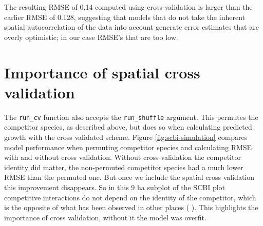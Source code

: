 \documentclass[12pt]{article}
\newenvironment{Shaded}{\begin{snugshade}}{\end{snugshade}}
\newcommand{\CommentTok}[1]{\textcolor[rgb]{0.56,0.35,0.01}{\textit{#1}}}
\newcommand{\DataTypeTok}[1]{\textcolor[rgb]{0.13,0.29,0.53}{#1}}
\newcommand{\KeywordTok}[1]{\textcolor[rgb]{0.13,0.29,0.53}{\textbf{#1}}}
\newcommand{\NormalTok}[1]{#1}
\newcommand{\OperatorTok}[1]{\textcolor[rgb]{0.81,0.36,0.00}{\textbf{#1}}}
\newcommand{\StringTok}[1]{\textcolor[rgb]{0.31,0.60,0.02}{#1}}
\begin{document}
\begin{Shaded}
\end{Shaded}

\begin{Shaded}
\end{Shaded}

The resulting RMSE of 0.14 computed using cross-validation is larger
than the earlier RMSE of 0.128, suggesting that models that do not take
the inherent spatial autocorrelation of the data into account generate
error estimates that are overly optimistic; in our case RMSE's that are
too low.

\hypertarget{importance-of-spatial-cross-validation}{%
\section{Importance of spatial cross
validation}\label{importance-of-spatial-cross-validation}}

The \texttt{run\_cv} function also accepts the \texttt{run\_shuffle}
argument. This permutes the competitor species, as described above, but
does so when calculating predicted growth with the cross validated
scheme. Figure \ref{fig:scbi-simulation} compares model performance when
permuting competitor species and calculating RMSE with and without cross
validation. Without cross-validation the competitor identity did matter,
the non-permuted competitor species had a much lower RMSE than the
permuted one. But once we include the spatial cross validation this
improvement disappears. So in this 9 ha subplot of the SCBI plot
competitive interactions do not depend on the identity of the
competitor, which is the opposite of what has been observed in other
places (\citet{allen_permutation_2020} \citet{uriarte_spatially_2004}).
This highlights the importance of cross validation, without it the model
was overfit.
\end{document}
